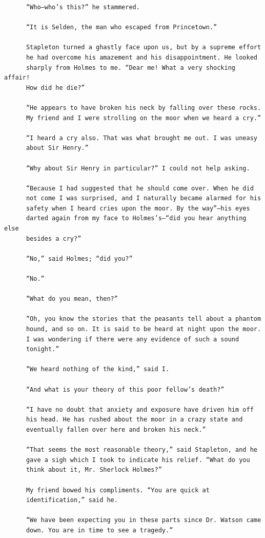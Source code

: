 \documentclass{article}
\begin{document}
\begin{verbatim}
      “Who—who’s this?” he stammered.

      “It is Selden, the man who escaped from Princetown.”

      Stapleton turned a ghastly face upon us, but by a supreme effort
      he had overcome his amazement and his disappointment. He looked
      sharply from Holmes to me. “Dear me! What a very shocking affair!
      How did he die?”

      “He appears to have broken his neck by falling over these rocks.
      My friend and I were strolling on the moor when we heard a cry.”

      “I heard a cry also. That was what brought me out. I was uneasy
      about Sir Henry.”

      “Why about Sir Henry in particular?” I could not help asking.

      “Because I had suggested that he should come over. When he did
      not come I was surprised, and I naturally became alarmed for his
      safety when I heard cries upon the moor. By the way”—his eyes
      darted again from my face to Holmes’s—“did you hear anything else
      besides a cry?”

      “No,” said Holmes; “did you?”

      “No.”

      “What do you mean, then?”

      “Oh, you know the stories that the peasants tell about a phantom
      hound, and so on. It is said to be heard at night upon the moor.
      I was wondering if there were any evidence of such a sound
      tonight.”

      “We heard nothing of the kind,” said I.

      “And what is your theory of this poor fellow’s death?”

      “I have no doubt that anxiety and exposure have driven him off
      his head. He has rushed about the moor in a crazy state and
      eventually fallen over here and broken his neck.”

      “That seems the most reasonable theory,” said Stapleton, and he
      gave a sigh which I took to indicate his relief. “What do you
      think about it, Mr. Sherlock Holmes?”

      My friend bowed his compliments. “You are quick at
      identification,” said he.

      “We have been expecting you in these parts since Dr. Watson came
      down. You are in time to see a tragedy.”


\end{verbatim}
\end{document}
